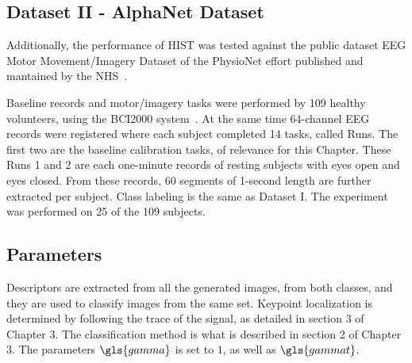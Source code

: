       
\subsection{Dataset II - AlphaNet Dataset}
Additionally, the performance of HIST was tested against the public dataset EEG Motor Movement/Imagery Dataset of the PhysioNet effort published and mantained by the NHS~\cite{Schalk2004,Goldberger2000}.  

Baseline records and motor/imagery tasks were performed by 109 healthy volunteers, using the BCI2000 system~\cite{Schalk2004}.  At the same time 64-channel EEG records were registered where each subject completed 14 tasks, called Runs.  The first two are the baseline calibration tasks, of relevance for this Chapter.  These Runs 1 and 2 are each one-minute records of resting subjects with eyes open and eyes closed.  From these records, 60 segments of 1-second length are further extracted per subject. Class labeling is the same as Dataset I.  The experiment was performed on 25 of the 109 subjects.


%
%


\subsection{Parameters}

Descriptors are extracted from all the generated images, from both classes, and they are used to classify images from the same set. 
Keypoint localization is determined by following the trace of the signal, as detailed in section 3 of Chapter 3.  The classification method is what is described in section 2 of Chapter 3.  The parameters $\gls{gamma}$ is set to $1$, as well as $\gls{gammat}$.  

